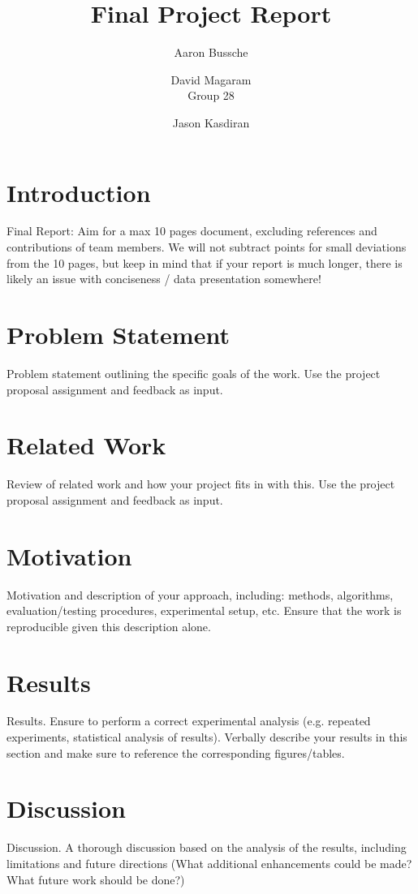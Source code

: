 \documentclass{article}
\title{Final Project Report}
\author{Aaron Bussche \and  David Magaram\\[0.3em] Group 28 \and Jason Kasdiran}
\begin{document}
	\maketitle

\section*{Introduction}
Final Report: Aim for a max 10 pages document, excluding references and contributions of team members. We will not subtract points for small deviations from the 10 pages, but keep in mind that if your report is much longer, there is likely an issue with conciseness / data presentation somewhere!


\section*{Problem Statement}
Problem statement outlining the specific goals of the work. Use the project proposal assignment and feedback as input.


\section*{Related Work}
Review of related work and how your project fits in with this. Use the project proposal assignment and feedback as input.

\section*{Motivation}
Motivation and description of your approach, including: methods, algorithms, evaluation/testing procedures, experimental setup, etc. Ensure that the work is reproducible given this description alone.

\section*{Results}
Results. Ensure to perform a correct experimental analysis (e.g. repeated experiments, statistical analysis of results). Verbally describe your results in this section and make sure to reference the corresponding figures/tables.


\section*{Discussion}
Discussion. A thorough discussion based on the analysis of the results, including limitations and future directions (What additional enhancements could be made? What future work should be done?)
\end{document}
